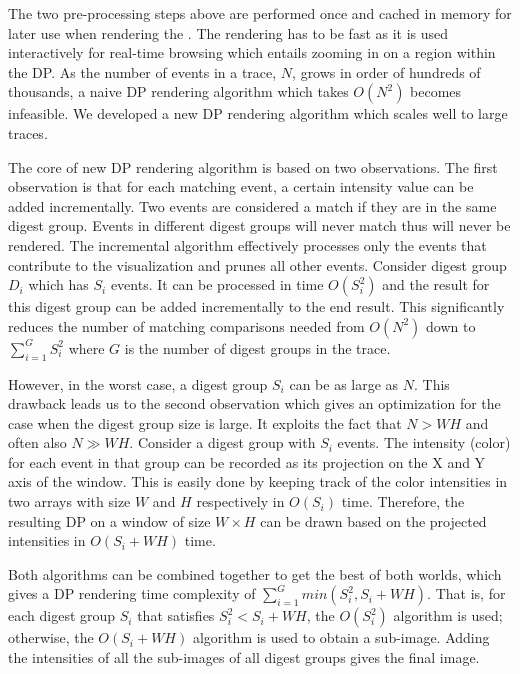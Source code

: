 The two pre-processing steps above are performed once and
cached in memory for later use when rendering the \VDP{}.
The \VDP{} rendering has to be fast as it is
used interactively for real-time browsing 
which entails zooming in on a region within the DP.
As the number of events in a trace, $N$, grows in order of hundreds of thousands,
a naive DP rendering algorithm which takes $O(N^2)$ becomes infeasible.
We developed a new DP rendering algorithm which scales well to large traces.

The core of new DP rendering algorithm is based on two observations.
The first observation is that for each matching event,
a certain intensity value can be added incrementally.
Two events are considered a match if they are in the same digest group.
Events in different digest groups will never match thus will never be rendered.
The incremental algorithm effectively processes only the events
that contribute to the visualization and prunes all other events.
Consider digest group $D_i$ which has $S_i$ events.
It can be processed in time $O(S_i^2)$
and the result for this digest group can be added incrementally to the 
end result.
This significantly reduces the number of matching comparisons needed
from $O(N^2)$ down to $\sum_{i=1}^{G} S_i^2$
where $G$ is the number of digest groups in the trace.

However, in the worst case, a digest group $S_i$ can be as large as $N$.
This drawback leads us to the second observation which
gives an optimization for the case when the digest group size is large.
It exploits the fact that $N > W H$ and often also $N \gg WH$.
Consider a digest group with $S_i$ events.
The intensity (color) for each event in that group can be recorded as
its projection on the X and Y axis of the window.
This is easily done by keeping track of the color intensities in
two arrays with size $W$ and $H$ respectively in $O(S_i)$ time.
Therefore, the resulting DP on a window of size $W \times H$
can be drawn based on the projected intensities in $O(S_i + W H)$ time.

Both algorithms can be combined together to
get the best of both worlds, which gives
a DP rendering time complexity of $\sum_{i=1}^{G} min(S_i^2, S_i + W H)$.
That is, for each digest group $S_i$ that satisfies $S_i^2 < S_i+W H$, 
the $O(S_i^2)$ algorithm is used;
otherwise, the $O(S_i + W H)$ algorithm is used to obtain a sub-image.
Adding the intensities of all the sub-images of all digest groups gives the final image.

